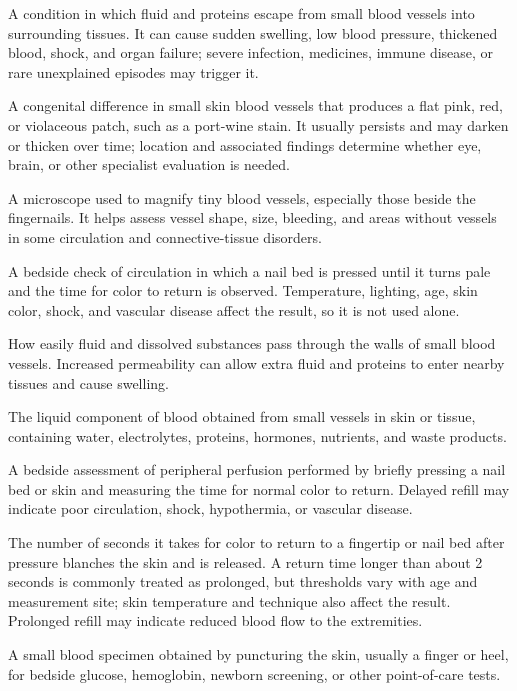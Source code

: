  A condition in which fluid and proteins escape from small blood vessels into surrounding tissues. It can cause sudden swelling, low blood pressure, thickened blood, shock, and organ failure; severe infection, medicines, immune disease, or rare unexplained episodes may trigger it.

 A congenital difference in small skin blood vessels that produces a flat pink, red, or violaceous patch, such as a port-wine stain. It usually persists and may darken or thicken over time; location and associated findings determine whether eye, brain, or other specialist evaluation is needed.

 A microscope used to magnify tiny blood vessels, especially those beside the fingernails. It helps assess vessel shape, size, bleeding, and areas without vessels in some circulation and connective-tissue disorders.

 A bedside check of circulation in which a nail bed is pressed until it turns pale and the time for color to return is observed. Temperature, lighting, age, skin color, shock, and vascular disease affect the result, so it is not used alone.

 How easily fluid and dissolved substances pass through the walls of small blood vessels. Increased permeability can allow extra fluid and proteins to enter nearby tissues and cause swelling.

 The liquid component of blood obtained from small vessels in skin or tissue, containing water, electrolytes, proteins, hormones, nutrients, and waste products.

 A bedside assessment of peripheral perfusion performed by briefly pressing a nail bed or
skin and measuring the time for normal color to return. Delayed refill may indicate poor
circulation, shock, hypothermia, or vascular disease.

 The number of seconds it takes for color to return to a fingertip or nail bed after pressure blanches the skin and is released. A return time longer than about 2 seconds is commonly treated as prolonged, but thresholds vary with age and measurement site; skin temperature and technique also affect the result. Prolonged refill may indicate reduced blood flow to the extremities.

 A small blood specimen obtained by puncturing the skin, usually a finger or heel, for bedside glucose, hemoglobin, newborn screening, or other point-of-care tests.

